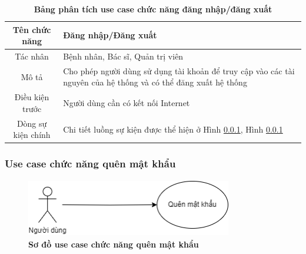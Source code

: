   \begin{table}[H]
    \caption{\bfseries \fontsize{12pt}{0pt}\selectfont Bảng phân tích use case chức năng đăng nhập/đăng xuất}
    \centering
    \begin{tabularx}{0.9\textwidth}{|c|X|}
      \hline
      \textbf{Tên chức năng} & \textbf{Đăng nhập/Đăng xuất} \\
      \hline
      Tác nhân & Bệnh nhân, Bác sĩ, Quản trị viên \\
      \hline
      Mô tả & Cho phép người dùng sử dụng tài khoản để truy cập vào các tài nguyên của hệ thống và có thể đăng xuất hệ thống
       \\
      \hline
      Điều kiện trước & Người dùng cần có kết nối Internet \\
      \hline
      Dòng sự kiện chính & 
        Chi tiết luồng sự kiện được thể hiện ở Hình \ref{}, Hình \ref{} 
        \\
      \hline
    \end{tabularx}
  \end{table}

\subsubsection{Use case chức năng quên mật khẩu}
  \begin{figure}[H]
    \centering
    \includegraphics[width=9cm,height=2.5cm]{Images/use_case/use_case_forgot_password.png}
    \caption[Sơ đồ use case chức năng quên mật khẩu]{\bfseries \fontsize{12pt}{0pt}
    \selectfont Sơ đồ use case chức năng quên mật khẩu}
    \label{use_case_forget_password} %
  \end{figure}


